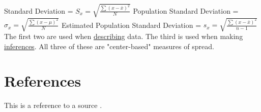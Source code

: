 \documentclass[11pt]{report}
\begin{document}
\noindent Standard Deviation = $S_x = \sqrt{\frac{\sum(x - \bar{x})^2}{N}}$
\newline
Population Standard Deviation = $\sigma_x = \sqrt{\frac{\sum(x - \mu)^2}{N}}$
\newline 
Estimated Population Standard Deviation = $s_x = \sqrt{\frac{\sum(x - \bar{x})^2}{n-1}}$
\newline\newline
The first two are used when \underline{describing} data. The third is used when making \underline{inferences}. All three of these are "center-based" measures of spread. 


\section{References}
This is a reference to a source \cite{example}.



\end{document}
